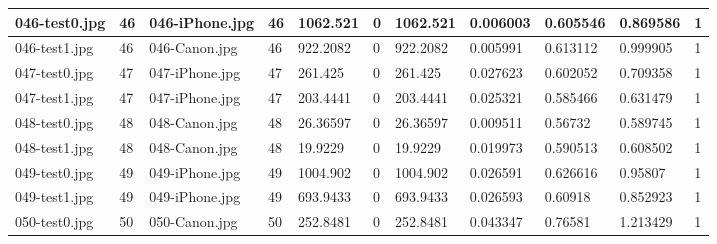 \begin{landscape}
\begin{longtable}{|p{2cm}|p{1cm}|p{2cm}|p{1cm}|p{2cm}|p{1cm}|p{2cm}|p{2cm}|p{2cm}|p{2cm}|p{1cm}|}
		046-test0.jpg   & 46               & 046-iPhone.jpg        & 46                          & 1062.521              & 0                       & 1062.521                   & 0.006003              & 0.605546              & 0.869586                 & 1                \\ \hline
		046-test1.jpg   & 46               & 046-Canon.jpg         & 46                          & 922.2082              & 0                       & 922.2082                   & 0.005991              & 0.613112              & 0.999905                 & 1                \\ \hline
		047-test0.jpg   & 47               & 047-iPhone.jpg        & 47                          & 261.425               & 0                       & 261.425                    & 0.027623              & 0.602052              & 0.709358                 & 1                \\ \hline
		047-test1.jpg   & 47               & 047-iPhone.jpg        & 47                          & 203.4441              & 0                       & 203.4441                   & 0.025321              & 0.585466              & 0.631479                 & 1                \\ \hline
		048-test0.jpg   & 48               & 048-Canon.jpg         & 48                          & 26.36597              & 0                       & 26.36597                   & 0.009511              & 0.56732               & 0.589745                 & 1                \\ \hline
		048-test1.jpg   & 48               & 048-Canon.jpg         & 48                          & 19.9229               & 0                       & 19.9229                    & 0.019973              & 0.590513              & 0.608502                 & 1                \\ \hline
		049-test0.jpg   & 49               & 049-iPhone.jpg        & 49                          & 1004.902              & 0                       & 1004.902                   & 0.026591              & 0.626616              & 0.95807                  & 1                \\ \hline
		049-test1.jpg   & 49               & 049-iPhone.jpg        & 49                          & 693.9433              & 0                       & 693.9433                   & 0.026593              & 0.60918               & 0.852923                 & 1                \\ \hline
		050-test0.jpg   & 50               & 050-Canon.jpg         & 50                          & 252.8481              & 0                       & 252.8481                   & 0.043347              & 0.76581               & 1.213429                 & 1                \\ \hline

\end{longtable}
\end{landscape}

